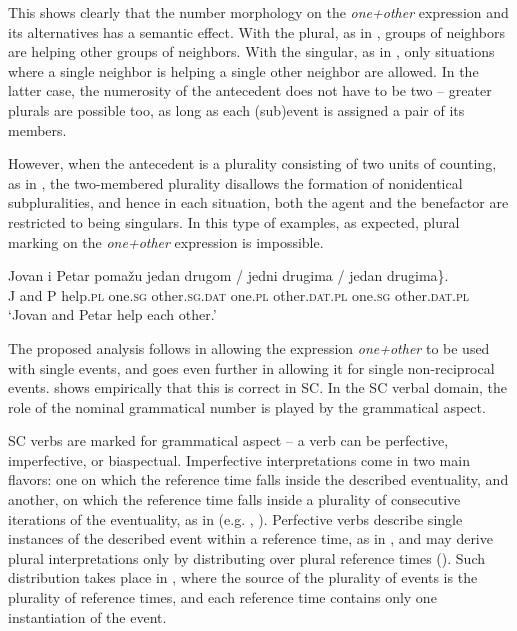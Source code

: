 \documentclass[output=paper,colorlinks,citecolor=brown]{langscibook}
\begin{document}
This shows clearly that the number morphology on the \textit{one+other} expression and its alternatives has a semantic effect. With the plural, as in , groups of neighbors are helping other groups of neighbors. With the singular, as in , only situations where a single neighbor is helping a single other neighbor are allowed. In the latter case, the numerosity of the antecedent does not have to be two -- greater plurals are possible too, as long as each (sub)event is assigned a pair of its members. 

However, when the antecedent is a plurality consisting of two units of coun\-ting, as in , the two-membered plurality disallows the formation of nonidentical subpluralities, and hence in each situation, both the agent and the benefactor are restricted to being singulars. In this type of examples, as expected, plural marking on the \textit{one+other} expression is impossible.

\ea\label{Jovan} \gll Jovan i Petar pomažu \minsp{\{} jedan drugom / \minsp{*} jedni drugima / {\minsp{*} jedan} drugima\}.\\
 J and P help.\textsc{pl} {} one.\textsc{sg} other.\textsc{sg.dat} {} {} one.\textsc{pl} other.\textsc{dat.\textsc{pl}} {} {{} one.\textsc{sg}} other.\textsc{dat.\textsc{pl}} \\
 \glt `Jovan and Petar help each other.'
 \z

\noindent The proposed analysis follows \citet{z14} in allowing the expression \textit{one+other} to be used with single events, and goes even further in allowing it for single non-reciprocal events.  shows empirically that this is correct in SC. In the SC verbal domain, the role of the nominal grammatical number is played by the grammatical aspect. 

SC verbs are marked for grammatical aspect -- a verb can be perfective, imperfective, or biaspectual. Imperfective interpretations come in two main flavors: one on which the reference time falls inside the described eventuality, and another, on which the reference time falls inside a plurality of consecutive iterations of the eventuality, as in  (e.g. \citealt{a06}, \citealt{j07}). Perfective verbs describe single instances of the described event within a reference time, as in , and may derive plural interpretations only by distributing over plural reference times (\citealt{a06}). Such distribution takes place in , where the source of the plurality of events is the plurality of reference times, and each reference time contains only one instantiation of the event.
\end{document}

